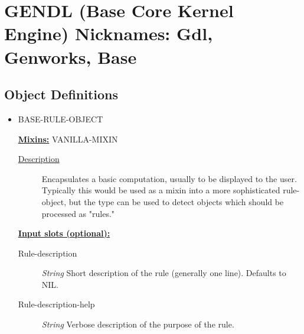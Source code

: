\documentclass [11pt]{book}
\begin{document}
\section{GENDL (Base Core Kernel Engine) Nicknames: Gdl, Genworks, Base}

\label{sec:gendl(basecorekernelengine)nicknames:gdl,genworks,base}





\subsection{Object Definitions}

\label{subsec:objectdefinitions}



\begin{itemize}

\item {}BASE-RULE-OBJECT


\textbf{
\underline{Mixins:}} VANILLA-MIXIN





\begin{description}

\item [
\underline{Description}]


Encapsulates a basic computation, usually to be displayed to the user.
Typically this would be used as a mixin into a more sophisticated rule-object, but the type can be
 used to detect objects which should be processed as "rules."



\end{description}








\textbf{
\underline{Input slots (optional):}}

\begin{description}

\item [Rule-description]
\emph{String} Short description of the rule (generally one line). Defaults to NIL.


\item [Rule-description-help]
\emph{String} Verbose description of the purpose of the rule.



\end{description}
\end{itemize}
\end{document}

